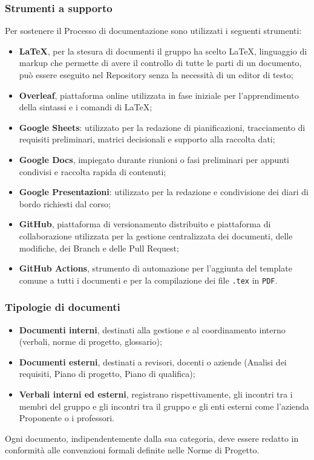 \documentclass[a4paper,12pt]{article}
\begin{document}
\subsubsection{Strumenti a supporto}
Per sostenere il Processo di documentazione sono utilizzati i seguenti strumenti:
\begin{itemize}
  \item \textbf{\LaTeX}, per la stesura di documenti il gruppo ha scelto \LaTeX, linguaggio di markup che permette di avere il controllo di tutte le parti di un documento, può essere eseguito nel Repository senza la necessità di un editor di testo; 
  \item \textbf{Overleaf}, piattaforma online utilizzata in fase iniziale per l'apprendimento della sintassi e i comandi di \LaTeX;
  \item \textbf{Google Sheets}: utilizzato per la redazione di pianificazioni, tracciamento di requisiti preliminari, matrici decisionali e supporto alla raccolta dati;
  \item \textbf{Google Docs}, impiegato durante riunioni o fasi preliminari per appunti condivisi e raccolta rapida di contenuti;
  \item \textbf{Google Presentazioni}: utilizzato per la redazione e condivisione dei diari di bordo richiesti dal corso;
  \item \textbf{GitHub}, piattaforma di versionamento distribuito e piattaforma di collaborazione utilizzata per la gestione centralizzata dei documenti, delle modifiche, dei Branch e delle Pull Request;  
  \item \textbf{GitHub Actions}, strumento di automazione per l'aggiunta del template comune a tutti i documenti e per la compilazione dei file \texttt{.tex} in \texttt{PDF}.
\end{itemize}

\subsubsection{Tipologie di documenti}
\begin{itemize}
    \item \textbf{Documenti interni}, destinati alla gestione e al coordinamento interno (verbali, norme di progetto, glossario);
    \item \textbf{Documenti esterni}, destinati a revisori, docenti o aziende (Analisi dei requisiti, Piano di progetto, Piano di qualifica);
    \item \textbf{Verbali interni ed esterni}, registrano rispettivamente, gli incontri tra i membri del gruppo e gli incontri tra il gruppo e gli enti esterni come l'azienda Proponente o i professori.
\end{itemize}
Ogni documento, indipendentemente dalla sua categoria, deve essere redatto in conformità alle convenzioni formali definite nelle Norme di Progetto.
\end{document}

